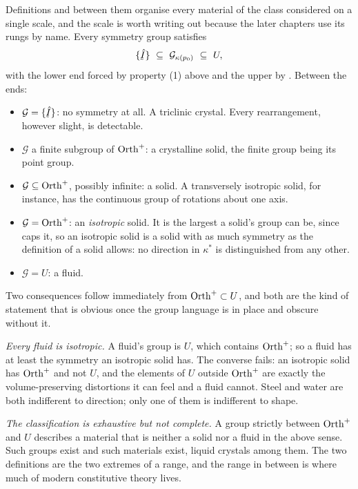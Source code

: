 \begin{remark}
\label{rem:ch8ladder}
Definitions  and  between them organise every
material of the class considered on a single scale, and the scale is
worth writing out because the later chapters use its rungs by name.
Every symmetry group satisfies
\[
   \{\hI\}\ \subseteq\ \mathcal{G}_{\kappa(p_{0})}\ \subseteq\ U ,
\]
with the lower end forced by property (1) above and the upper by
. Between the ends:
\begin{itemize}\itemsep1pt
\item $\mathcal{G}=\{\hI\}$: no symmetry at all. A triclinic crystal.
      Every rearrangement, however slight, is detectable.
\item $\mathcal{G}$ a finite subgroup of $\operatorname{Orth}^{+}$: a crystalline
      solid, the finite group being its point group.
\item $\mathcal{G}\subseteq\operatorname{Orth}^{+}$, possibly infinite: a solid.
      A transversely isotropic solid, for instance, has the continuous
      group of rotations about one axis.
\item $\mathcal{G}=\operatorname{Orth}^{+}$: an \emph{isotropic} solid. It is the
      largest a solid's group can be, since  caps it, so an
      isotropic solid is a solid with as much symmetry as the definition
      of a solid allows: no direction in $\kappa^{*}$ is distinguished
      from any other.
\item $\mathcal{G}=U$: a fluid.
\end{itemize}
Two consequences follow immediately from $\operatorname{Orth}^{+}\subset U$, and both
are the kind of statement that is obvious once the group language is in
place and obscure without it.

\emph{Every fluid is isotropic.} A fluid's group is $U$, which contains
$\operatorname{Orth}^{+}$; so a fluid has at least the symmetry an isotropic solid
has. The converse fails: an isotropic solid has $\operatorname{Orth}^{+}$ and not $U$,
and the elements of $U$ outside $\operatorname{Orth}^{+}$ are exactly the
volume-preserving distortions it can feel and a fluid cannot. Steel and
water are both indifferent to direction; only one of them is indifferent
to shape.

\emph{The classification is exhaustive but not complete.} A group
strictly between $\operatorname{Orth}^{+}$ and $U$ describes a material that is
neither a solid nor a fluid in the above sense. Such groups exist and
such materials exist, liquid crystals among them. The two definitions
are the two extremes of a range, and the range in between is where much
of modern constitutive theory lives.
\end{remark}

